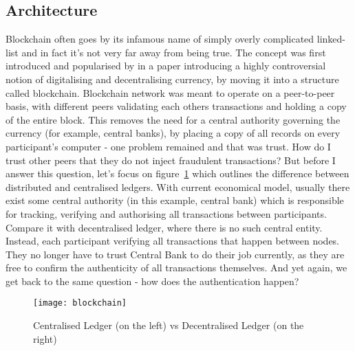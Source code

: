 \subsection{Architecture}
Blockchain often goes by its infamous name of simply overly complicated linked-list and in fact it's not very far away from being true. The concept was first introduced and popularised by \citet{nakamoto2008peer} in a paper introducing a highly controversial notion of digitalising and decentralising currency, by moving it into a structure called blockchain. Blockchain network was meant to operate on a peer-to-peer basis, with different peers validating each others transactions and holding a copy of the entire block. This removes the need for a central authority governing the currency (for example, central banks), by placing a copy of all records on every participant's computer - one problem remained and that was trust. How do I trust other peers that they do not inject fraudulent transactions? But before I answer this question, let's focus on figure~\ref{fig:blockchain} which outlines the difference between distributed and centralised ledgers. With current economical model, usually there exist some central authority (in this example, central bank) which is responsible for tracking, verifying and authorising all transactions between participants. Compare it with decentralised ledger, where there is no such central entity. Instead, each participant verifying all transactions that happen between nodes. They no longer have to trust Central Bank to do their job currently, as they are free to confirm the authenticity of all transactions themselves. And yet again, we get back to the same question - how does the authentication happen?

\begin{figure}[ht]
    \centering
    \texttt{[image: blockchain]}
    \caption{Centralised Ledger (on the left) vs Decentralised Ledger (on the right)}
    \label{fig:blockchain}
\end{figure}

